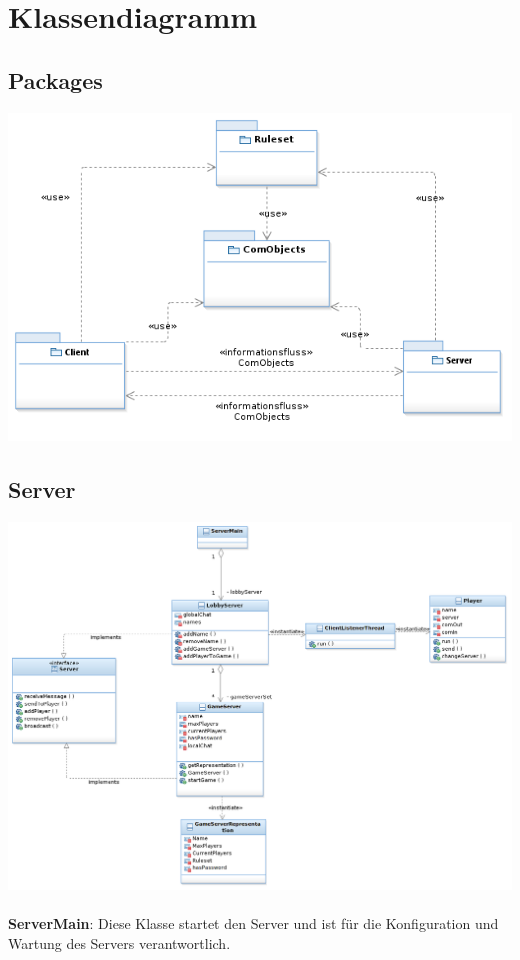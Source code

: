 \documentclass{article}
\begin{document}
\section{Klassendiagramm}

\subsection{Packages}
\includegraphics[width=\textwidth]{Packages}

\subsection{Server}
\includegraphics[width=\textwidth]{Entwurf_ServerDiagram}
\\ \\
\textbf{ServerMain}: Diese Klasse startet den Server und ist für die Konfiguration und Wartung des Servers verantwortlich. \\
\end{document}
